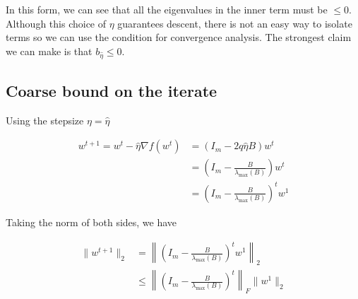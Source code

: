 \documentclass[11pt]{article}
\begin{document}
In this form, we can see that all the eigenvalues in the inner term must be $\leq 0$. Although this choice of $\eta$ guarantees descent, there is not an easy way to isolate terms so we can use the condition for convergence analysis. The strongest claim we can make is that $b_{\hat{\eta}} \leq 0$.




\subsection{Coarse bound on the iterate}

Using the stepsize $\eta = \hat{\eta}$

\begin{align*}
    w^{t+1} = w^t - \hat{\eta} \nabla f(w^t)
    &= (I_m - 2q \hat{\eta} B)w^t \\
    &= \left( I_m - \frac{B}{\lambda_{\max}(B)} \right) w^t \\
    &= \left( I_m - \frac{B}{\lambda_{\max}(B)} \right)^t w^1
\end{align*}

Taking the norm of both sides, we have

\begin{align*}
    \|w^{t+1}\|_2 &= \left\|\left( I_m - \frac{B}{\lambda_{\max}(B)} \right)^t w^1 \right\|_2 \\
    &\leq \left\|\left( I_m - \frac{B}{\lambda_{\max}(B)} \right)^t \right\|_F \|w^1\|_2
\end{align*}
\end{document}
